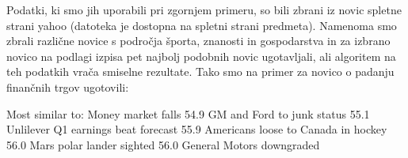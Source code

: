 Podatki, ki smo jih uporabili pri zgornjem primeru, so bili zbrani iz
novic spletne strani yahoo (datoteka je dostopna na spletni strani
predmeta). Namenoma smo zbrali različne novice s področja športa,
znanosti in gospodarstva in za izbrano novico na podlagi izpisa pet
najbolj podobnih novic ugotavljali, ali algoritem na teh podatkih
vrača smiselne rezultate. Tako smo na primer za novico o padanju
finančnih trgov ugotovili:

\begin{python}
Most similar to: Money market falls
54.9 GM and Ford to junk status
55.1 Unlilever Q1 earnings beat forecast
55.9 Americans loose to Canada in hockey
56.0 Mars polar lander sighted
56.0 General Motors downgraded
\end{python}
\fi
